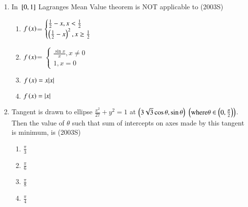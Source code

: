\documentclass[journal,12pt,twocolumn]{IEEEtran}
\theoremstyle{remark}
\begin{document}
\begin{enumerate}[start=9]
\item In ${}\left[0,1\right]$ Lagranges Mean Value theorem is NOT applicable to
\hfill (2003S)

\begin{enumerate}
    \item $f\left(x\right)$=
    $\begin{cases}
         \frac{1}{2}-x, x<\frac{1}{2}\\
	    \left(\frac{1}{2}-x\right)^2, x\geq \frac{1}{2}
    \end{cases}$\\
    \item $f\left(x\right)$=
    $\begin{cases}
	    \frac{\sin{x}}{x}, x\neq 0\\
        1, x=0
    \end{cases}$\\
    \item $f\left(x\right)=x|x|$
    \item $f\left(x\right)=|x|$\\
\end{enumerate}
\item Tangent is drawn to ellipse $\frac{x^2}{27}+y^2 = 1$ at $\left(3\sqrt{3}\cos{\theta},\sin{\theta}\right)$ $\left(\text{where}  \theta \in \left(0,\frac{\pi}{2}\right)\right)$. Then the value of $\theta$ such that sum of intercepts on axes made by this tangent is minimum, is
\hfill (2003S)
\begin{enumerate}
    \item $\frac{\pi}{3}$\\
    \item $\frac{\pi}{6}$\\
    \item $\frac{\pi}{8}$\\
    \item $\frac{\pi}{4}$\\
 \end{enumerate}
\end{enumerate}
\end{document}
